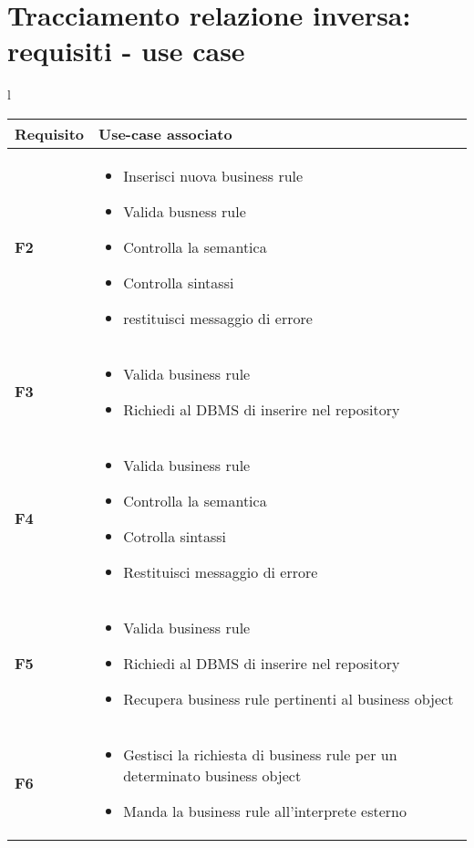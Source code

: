 \section{Tracciamento relazione inversa: requisiti - use case}
\large{
\begin{tabular}{l}
\begin{tabular}{||p{2cm}||p{10cm}||} \hline
\textbf{Requisito} & \textbf{Use-case associato} \\ \hline
\textbf {F2} & \begin{itemize}
\item Inserisci nuova business rule
\item Valida busness rule
\item Controlla la semantica
\item Controlla sintassi
\item restituisci messaggio di errore
\end{itemize} \\ \hline
\textbf{F3} & \begin{itemize}
\item Valida business rule
\item Richiedi al DBMS di inserire nel repository
\end{itemize} \\ \hline
\textbf{F4} & \begin{itemize}
\item Valida business rule
\item Controlla la semantica
\item Cotrolla sintassi
\item Restituisci messaggio di errore
\end{itemize} \\ \hline
\textbf{F5} & \begin{itemize}
\item Valida business rule
\item Richiedi al DBMS di inserire nel repository
\item Recupera business rule pertinenti al business object
\end{itemize} \\ \hline
\textbf{F6} & \begin{itemize}
\item Gestisci la richiesta di business rule per un determinato business object
\item Manda la business rule all'interprete esterno
\end{itemize} \\ \hline
\end{tabular}
\end{tabular}

}
